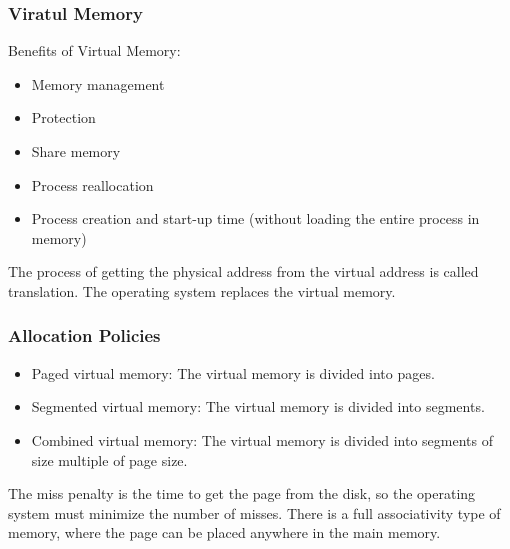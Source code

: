 \begin{frame}
    \frametitle{Viratul Memory}
    Benefits of Virtual Memory:
    \begin{itemize}
        \item Memory management
        \item Protection
        \item Share memory
        \item Process reallocation
        \item Process creation and start-up time (without loading the entire process in memory)
    \end{itemize}
    The process of getting the physical address from the virtual address is called translation.
    The operating system replaces the virtual memory.
\end{frame}

\begin{frame}
    \frametitle{Allocation Policies}
    \begin{itemize}
        \item Paged virtual memory: The virtual memory is divided into pages.
        \item Segmented virtual memory: The virtual memory is divided into segments.
        \item Combined virtual memory: The virtual memory is divided into segments of size multiple of page size.
    \end{itemize}
    The miss penalty is the time to get the page from the disk, so the operating system must minimize the number of misses.
    There is a full associativity type of memory, where the page can be placed anywhere in the main memory.
\end{frame}


